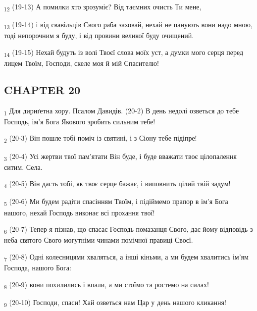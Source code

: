 \begin{tcolorbox}
\textsubscript{12} (19-13) А помилки хто зрозуміє? Від таємних очисть Ти мене,
\end{tcolorbox}
\begin{tcolorbox}
\textsubscript{13} (19-14) і від свавільців Свого раба заховай, нехай не панують вони надо мною, тоді непорочним я буду, і від провини великої буду очищений.
\end{tcolorbox}
\begin{tcolorbox}
\textsubscript{14} (19-15) Нехай будуть із волі Твоєї слова моїх уст, а думки мого серця перед лицем Твоїм, Господи, скеле моя й мій Спасителю!
\end{tcolorbox}
\subsection{CHAPTER 20}
\begin{tcolorbox}
\textsubscript{1} Для дириґетна хору. Псалом Давидів. (20-2) В день недолі озветься до тебе Господь, ім'я Бога Якового зробить сильним тебе!
\end{tcolorbox}
\begin{tcolorbox}
\textsubscript{2} (20-3) Він пошле тобі поміч із святині, і з Сіону тебе підіпре!
\end{tcolorbox}
\begin{tcolorbox}
\textsubscript{3} (20-4) Усі жертви твої пам'ятати Він буде, і буде вважати твоє цілопалення ситим. Села.
\end{tcolorbox}
\begin{tcolorbox}
\textsubscript{4} (20-5) Він дасть тобі, як твоє серце бажає, і виповнить цілий твій задум!
\end{tcolorbox}
\begin{tcolorbox}
\textsubscript{5} (20-6) Ми будем радіти спасінням Твоїм, і підіймемо прапор в ім'я Бога нашого, нехай Господь виконає всі прохання твої!
\end{tcolorbox}
\begin{tcolorbox}
\textsubscript{6} (20-7) Тепер я пізнав, що спасає Господь помазанця Свого, дає йому відповідь з неба святого Свого могутніми чинами помічної правиці Своєї.
\end{tcolorbox}
\begin{tcolorbox}
\textsubscript{7} (20-8) Одні колесницями хваляться, а інші кіньми, а ми будем хвалитись ім'ям Господа, нашого Бога:
\end{tcolorbox}
\begin{tcolorbox}
\textsubscript{8} (20-9) вони похилились і впали, а ми стоїмо та ростемо на силах!
\end{tcolorbox}
\begin{tcolorbox}
\textsubscript{9} (20-10) Господи, спаси! Хай озветься нам Цар у день нашого кликання!
\end{tcolorbox}
